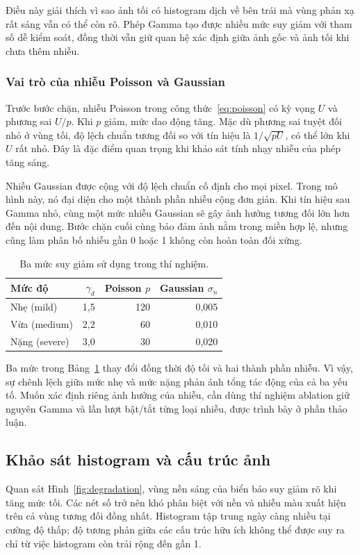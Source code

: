 Điều này giải thích vì sao ảnh tối có histogram dịch về bên trái mà vùng phản xạ rất sáng vẫn có thể còn rõ. Phép Gamma tạo được nhiều mức suy giảm với tham số dễ kiểm soát, đồng thời vẫn giữ quan hệ xác định giữa ảnh gốc và ảnh tối khi chưa thêm nhiễu.

\subsubsection{Vai trò của nhiễu Poisson và Gaussian}
Trước bước chặn, nhiễu Poisson trong công thức~\eqref{eq:poisson} có kỳ vọng $U$ và phương sai $U/p$. Khi $p$ giảm, mức dao động tăng. Mặc dù phương sai tuyệt đối nhỏ ở vùng tối, độ lệch chuẩn tương đối so với tín hiệu là $1/\sqrt{pU}$, có thể lớn khi $U$ rất nhỏ. Đây là đặc điểm quan trọng khi khảo sát tính nhạy nhiễu của phép tăng sáng.

Nhiễu Gaussian được cộng với độ lệch chuẩn cố định cho mọi pixel. Trong mô hình này, nó đại diện cho một thành phần nhiễu cộng đơn giản. Khi tín hiệu sau Gamma nhỏ, cùng một mức nhiễu Gaussian sẽ gây ảnh hưởng tương đối lớn hơn đến nội dung. Bước chặn cuối cùng bảo đảm ảnh nằm trong miền hợp lệ, nhưng cũng làm phân bố nhiễu gần 0 hoặc 1 không còn hoàn toàn đối xứng.

\begin{table}[htbp]
\centering
\caption{Ba mức suy giảm sử dụng trong thí nghiệm.}
\begin{tabular}{lrrr}
\toprule
Mức độ & $\gamma_d$ & Poisson $p$ & Gaussian $\sigma_n$ \\
\midrule
Nhẹ (mild) & 1,5 & 120 & 0,005 \\
Vừa (medium) & 2,2 & 60 & 0,010 \\
Nặng (severe) & 3,0 & 30 & 0,020 \\
\bottomrule
\end{tabular}
\label{tab:degrade}
\end{table}

Ba mức trong Bảng~\ref{tab:degrade} thay đổi đồng thời độ tối và hai thành phần nhiễu. Vì vậy, sự chênh lệch giữa mức nhẹ và mức nặng phản ánh tổng tác động của cả ba yếu tố. Muốn xác định riêng ảnh hưởng của nhiễu, cần dùng thí nghiệm ablation giữ nguyên Gamma và lần lượt bật/tắt từng loại nhiễu, được trình bày ở phần thảo luận.

\subsection{Khảo sát histogram và cấu trúc ảnh}
Quan sát Hình~\ref{fig:degradation}, vùng nền sáng của biển báo suy giảm rõ khi tăng mức tối. Các nét số trở nên khó phân biệt với nền và nhiễu màu xuất hiện trên cả vùng tương đối đồng nhất. Histogram tập trung ngày càng nhiều tại cường độ thấp; độ tương phản giữa các cấu trúc hữu ích không thể được suy ra chỉ từ việc histogram còn trải rộng đến gần 1.


